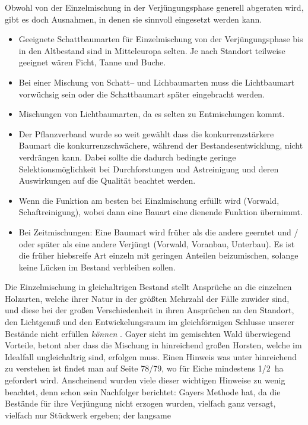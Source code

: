 \documentclass[twocolumn]{scrartcl}
\begin{document}
Obwohl von der Einzelmischung in der Verjüngungsphase generell
abgeraten wird, gibt es doch Ausnahmen, in denen sie sinnvoll
eingesetzt werden kann.
\begin{itemize}
\item Geeignete Schattbaumarten für Einzelmischung von der
  Verjüngungsphase bis in den Altbestand sind in Mitteleuropa
  selten. Je nach Standort teilweise geeignet wären Ficht, Tanne und
  Buche.
\item Bei einer Mischung von Schatt-- und Lichbaumarten muss die
  Lichtbaumart vorwüchsig sein oder die Schattbaumart später
  eingebracht werden.
\item Mischungen von Lichtbaumarten, da es selten zu Entmischungen
  kommt.
\item Der Pflanzverband wurde so weit gewählt dass die
  konkurrenzstärkere Baumart die konkurrenzschwächere, während der
  Bestandesentwicklung, nicht verdrängen kann. Dabei sollte die
  dadurch bedingte geringe Selektionsmöglichkeit bei Durchforstungen
  und Astreinigung und deren Auswirkungen auf die Qualität beachtet
  werden.
\item Wenn die Funktion am besten bei Einzlmischung erfüllt wird
  (Vorwald, Schaftreinigung), wobei dann eine Bauart eine dienende
  Funktion übernimmt.
\item Bei Zeitmischungen: Eine Baumart wird früher als die andere
  geerntet und / oder später als eine andere Verjüngt (Vorwald,
  Voranbau, Unterbau). Es ist die früher hiebsreife Art einzeln mit
  geringen Anteilen beizumischen, solange keine Lücken im Bestand
  verbleiben sollen.
\end{itemize}
\frqq Die Einzelmischung in gleichaltrigen Bestand stellt Ansprüche an
die einzelnen Holzarten, welche ihrer Natur in der größten Mehrzahl
der Fälle zuwider sind, und diese bei der großen Verschiedenheit in
ihren Ansprüchen an den Standort, den Lichtgenuß und den
Entwickelungsraum im gleichförmigen Schlusse unserer Bestände nicht
erfüllen \emph{können}\flqq{}
\citep[S.~147]{gayer1886DerGemischteWald}. Gayer sieht im gemischten
Wald überwiegend Vorteile, betont aber dass die Mischung in
hinreichend großen Horsten, welche im Idealfall ungleichaltrig sind,
erfolgen muss. Einen Hinweis was unter hinreichend zu verstehen ist
findet man auf Seite 78/79, wo für Eiche mindestens 1/2~ha gefordert
wird. Anscheinend wurden viele dieser wichtigen Hinweise zu wenig
beachtet, denn schon sein Nachfolger berichtet: \frqq Gayers Methode
hat, da die Bestände für ihre Verjüngung nicht erzogen wurden,
vielfach ganz versagt, vielfach nur Stückwerk ergeben; der langsame
\end{document}
